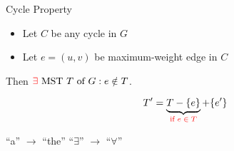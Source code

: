 
\begin{frame}{}
  \begin{center}
    {}
  \end{center}
\end{frame}

\begin{frame}{}
  \begin{block}{Cycle Property}
    \begin{itemize}
      \item Let $C$ be any cycle in $G$
      \item Let $e = (u,v)$ be  maximum-weight edge in $C$
    \end{itemize}

    \centerline{Then $\textcolor{red}{\exists} \text{ MST } T \text{ of } G: e \notin T$.}
  \end{block}


  \pause
  \vspace{-0.30cm}
  \[
    T' = \underbrace{T - \{e\}}_{\textcolor{red}{\text{if } e \;\in\; T}} + \{e'\}
  \]

  \pause
  \begin{center}
    {``a'' $\to$ ``the'' \red{$\implies$} ``$\exists$'' $\to$ ``$\forall$''}
  \end{center}
\end{frame}

